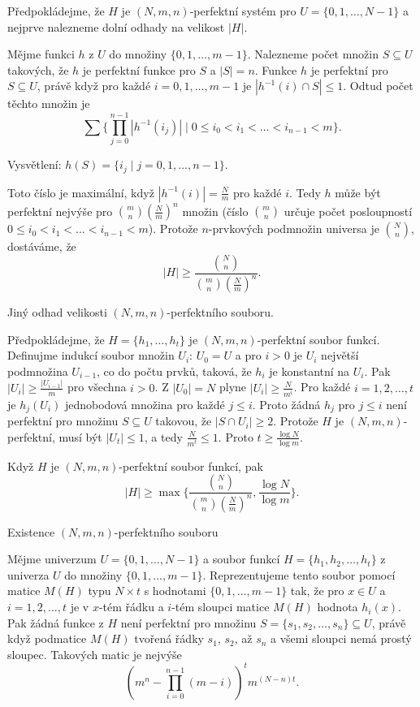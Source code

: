 \documentclass[a4paper,12pt]{article}
\begin{document}
Předpokládejme, že $H$  je $(N,m,n)$-perfektní 
systém pro $U=\{0,1,\dots,N-1\}$ a nejprve nalezneme dolní 
odhady na velikost $|H|$.

Mějme funkci $h$ z $U$ do množiny $\{0,1,\dots,m-
1\}$. 
Nalezneme počet množin $S\subseteq U$ takových, že  
$h$ je perfektní funkce pro $S$ a $|S|=n$. Funkce $h$ je perfektní pro 
$S\subseteq U$, právě když pro každé $i=0,1,\dots,m-
1$ je 
$|h^{-1}(i)\cap S|\le 1$. Odtud počet těchto množin je
$$\sum \{\prod_{j=0}^{n-1}|h^{-1}(i_j)|\mid 0\le i_0<i_1<\dots<i_{
n-1}<m\}.$$

Vysvětlení: $h(S)=\{i_j\mid j=0,1,\dots,n-1\}$.

Toto číslo je maximální, když $|h^{-1}(
i)|=\frac Nm$ pro každé $i$. 
Tedy $h$ může být perfektní nejvýše pro $\binom 
mn(\frac Nm)^n$ 
množin (číslo $\binom mn$ určuje počet posloupností 
$0\le i_0<i_1<\dots<i_{n-1}<m$). Protože $n$-prvkových 
podmnožin universa je $\binom Nn$, dostáváme, že 
$$|H|\ge\frac {\binom Nn}{\binom mn(\frac Nm)^n}.$$

Jiný odhad velikosti $(N,m,n)$-perfektního souboru.

Předpokládejme, že $H=\{h_1,\dots,h_t\}$ je 
$(N,m,n)$-perfektní soubor funkcí.  Definujme indukcí 
soubor množin $U_i$:\newline 
$U_0=U$ a pro 
$i>0$ je $U_i$ největší podmnožina $U_{i-1}$, co do počtu 
prvků, 
taková, že $h_i$ je konstantní na $U_i$.  Pak $|U_i|\ge\frac {
|U_{i-1}|}m$ 
pro všechna $i>0$.  Z $|U_0|=N$ plyne $|U_i|\ge\frac N{m^i}$.  Pro každé 
$i=1,2,\dots,t$ je $h_j(U_i)$ jednobodová množina pro každé 
$j\le i$.  Proto žádná $h_j$ pro $j\le i$ není perfektní pro 
množinu $S\subseteq U$ takovou, že $|S\cap U_i|\ge 2$.  Protože $
H$ je 
$(N,m,n)$-perfektní, musí být $|U_t|\le 1$, a tedy $\frac 
N{m^t}\le 1$.  Proto 
$t\ge\frac {\log N}{\log m}$.    

Když $H$ je $(N,m,n)$-perfektní soubor 
funkcí, pak 
$$|H|\ge\max\{\frac {\binom Nn}{\binom mn(\frac Nm)^n},\frac {\log 
N}{\log m}\}.$$
\endproclaim

\subhead
Existence $(N,m,n)$-perfektního souboru
\endsubhead

Mějme univerzum $U=\{0,1,\dots,N-1\}$ a soubor 
funkcí $H=\{h_1,h_2,\dots,h_t\}$ z univerza $U$ do množiny 
$\{0,1,\dots,m-1\}$.  Reprezentujeme tento soubor pomocí 
matice $M(H)$ typu $N\times t$ s hodnotami $\{0,1,\dots,m-1\}$ tak, 
že pro $x\in U$ a $i=1,2,\dots,t$ je 
v $x$-tém řádku a $i$-tém sloupci matice $M(H)$ 
hodnota $h_i(x)$. Pak žádná funkce z $H$ 
není perfektní pro množinu $S=\{s_1,s_2,\dots,s_n\}\subseteq 
U$, 
právě když podmatice $M(H)$ tvoře\-ná 
řádky $s_1$, $s_2$, až $s_n$ a všemi sloupci nemá prostý sloupec. 
Ta\-ko\-vých matic je nejvýše 
$$(m^n-\prod_{i=0}^{n-1}(m-i))^tm^{(N-n)t}.$$
\end{document}
